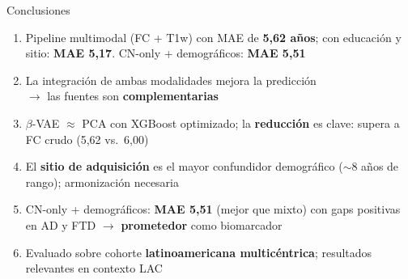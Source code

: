 \documentclass[aspectratio=169, 11pt]{beamer}
\newcommand{\highlight}[1]{\textcolor{uncaccent}{\textbf{#1}}}
\begin{document}
\begin{frame}{Conclusiones}
  \begin{enumerate}
    \item Pipeline multimodal (FC + T1w) con MAE de \highlight{5,62 años}; con educación y sitio: \highlight{MAE 5,17}. CN-only + demográficos: \highlight{MAE 5,51}

    \vspace{0.18cm}
    \item La integración de ambas modalidades mejora la predicción\\$\rightarrow$ las fuentes son \highlight{complementarias}

    \vspace{0.18cm}
    \item $\beta$-VAE $\approx$ PCA con XGBoost optimizado; la \highlight{reducción} es clave: supera a FC crudo (5,62 vs.\ 6,00)

    \vspace{0.18cm}
    \item El \highlight{sitio de adquisición} es el mayor confundidor demográfico ($\sim$8 años de rango); armonización necesaria

    \vspace{0.18cm}
    \item CN-only + demográficos: \highlight{MAE 5,51} (mejor que mixto) con gaps positivas en AD y FTD $\rightarrow$ \highlight{prometedor} como biomarcador

    \vspace{0.18cm}
    \item Evaluado sobre cohorte \highlight{latinoamericana multicéntrica}; resultados relevantes en contexto LAC
  \end{enumerate}
\end{frame}
\end{document}
